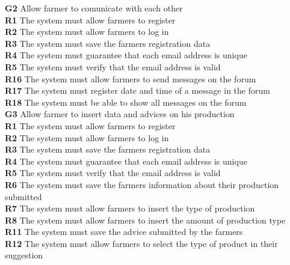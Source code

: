 \textbf{G2} Allow farmer to comunicate with each other\\
    \textbf{R1} The system must allow farmers to register\\
    \textbf{R2} The system must allow farmers to log in\\
    \textbf{R3} The system must save the farmers registration data\\
    \textbf{R4} The system must guarantee that each email address is unique\\
    \textbf{R5} The system must verify that the email address is valid\\
    \textbf{R16} The system must allow farmers to send messages on the forum\\
    \textbf{R17} The system must register date and time of a message in the forum\\
    \textbf{R18} The system must be able to show all messages on the forum\\
    
\textbf{G3} Allow farmer to insert data and advices on his production\\
    \textbf{R1} The system must allow farmers to register\\
    \textbf{R2} The system must allow farmers to log in\\
    \textbf{R3} The system must save the farmers registration data\\
    \textbf{R4} The system must guarantee that each email address is unique\\
    \textbf{R5} The system must verify that the email address is valid\\
    \textbf{R6} The system must save the farmers information about their production submitted\\
    \textbf{R7} The system must allow farmers to insert the type of production\\
    \textbf{R8} The system must allow farmers to insert the amount of production type\\
    \textbf{R11} The system must save the advice submitted by the farmers\\
    \textbf{R12} The system must allow farmers to select the type of product in their suggestion\\
    \textbf{}
    
